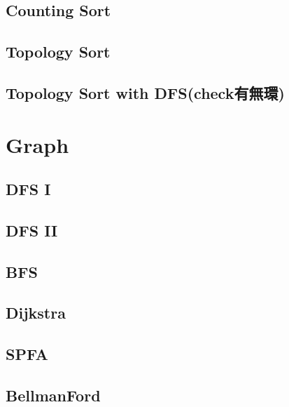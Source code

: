 \subsection{Counting Sort}


\subsection{Topology Sort}


\subsection{Topology Sort with DFS(check有無環)}


\section{Graph}

\subsection{DFS I}

\subsection{DFS II}


\subsection{BFS}


\subsection{Dijkstra}


\subsection{SPFA}


\subsection{BellmanFord}


